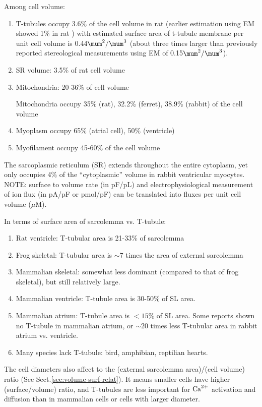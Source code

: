 Among cell volume:
\begin{enumerate}
\item T-tubules occupy 3.6\% of the cell volume \citep{soeller1999} in rat
(earlier estimation using EM showed 1\% in rat \citep{page1973}) with estimated
surface area of t-tubule membrane per unit cell volume is 0.44$\mum^2/\mum^3$
(about three times larger than previously reported stereological measurements
using EM of 0.15$\mum^2/\mum^3$).

\item SR volume: 3.5\% of rat cell volume \citep{page1971, page1978}

\item Mitochondria: 20-36\% of cell volume

Mitochondria occupy 35\% (rat), 32.2\% (ferret),  38.9\% (rabbit) of the cell
volume \citep{barth1992}
 
\item Myoplasm occupy 65\% (atrial cell), 50\% (ventricle)

\item Myofilament occupy 45-60\% of the cell volume
\end{enumerate}
The sarcoplasmic reticulum (SR) extends throughout the entire cytoplasm, yet
only occupies 4\% of the ``cytoplasmic'' volume in rabbit ventricular myocytes. 
NOTE: surface to volume rate (in pF/pL) and electrophysiological measurement of
ion flux (in pA/pF or pmol/pF) can  be translated into fluxes per unit cell
volume ($\mu$M).


In terms of surface area of sarcolemma vs. T-tubule:
\begin{enumerate}
  \item Rat ventricle: T-tubular area is 21-33\% of sarcolemma
  \item Frog skeletal: T-tubular area is $\sim 7$ times the area of external
  sarcolemma
  \item Mammalian skeletal: somewhat less dominant (compared to that of frog
  skeletal), but still relatively large.
  \item Mammalian ventricle: T-tubule area is 30-50\% of SL area.
  \item Mammalian atrium: T-tubule area is $< 15\%$ of SL area. Some reports
  shown no T-tubule in mammalian atrium, or $\sim 20$ times less T-tubular area
  in rabbit atrium vs. ventricle. 
  \item Many species lack T-tubule: bird, amphibian, reptilian hearts.
\end{enumerate}
The cell diameters also affect to the (external sarcolemma area)/(cell volume)
ratio (See Sect.\ref{sec:volume-surf-relat}). It means smaller cells have higher
(surface/volume) ratio, and T-tubules are less important for ${\text{Ca}^{2+}}$ activation
and diffusion than in mammalian cells or cells with larger diameter. 

